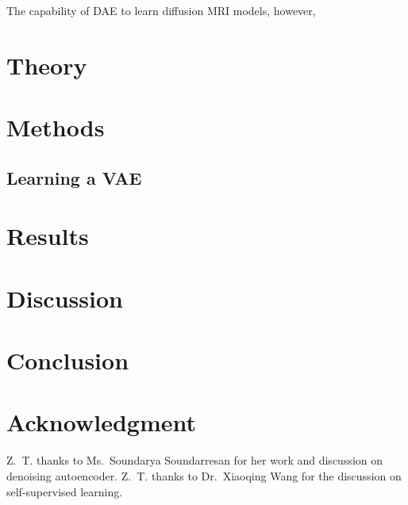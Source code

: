 \documentclass[journal,twoside,web]{ieeecolor}
\begin{document}
    The capability of DAE to learn diffusion MRI models, however, 



	\section{Theory}


	\section{Methods}

    \subsection{Learning a VAE}


	\section{Results}


	\section{Discussion}


	\section{Conclusion}


	\section*{Acknowledgment}

	Z.~T. thanks to Ms.~Soundarya Soundarresan for
	her work and discussion on denoising autoencoder.
	Z.~T. thanks to Dr.~Xiaoqing Wang for
	the discussion on self-supervised learning.

	
	
\end{document}
